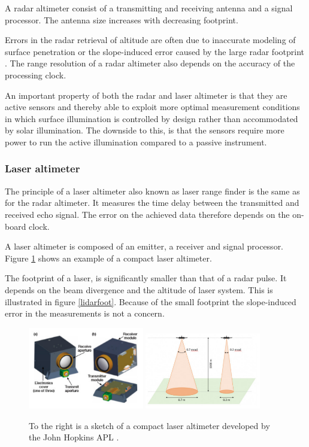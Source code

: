 A radar altimeter consist of a transmitting and receiving antenna and a signal processor. The antenna size increases with decreasing footprint.

Errors in the radar retrieval of altitude are often due to inaccurate modeling
of surface penetration or the slope-induced error caused by
the large radar footprint \cite{icealti}. The range resolution of a radar altimeter also depends on the accuracy of the processing clock.

An important property of both the radar and laser altimeter is that they are active sensors and thereby able to exploit more optimal measurement conditions in which surface illumination is controlled by design rather than accommodated by  solar illumination. The downside to this, is that the sensors require more power to run the active illumination compared to a passive instrument. 

\subsubsection{Laser altimeter}

The principle of a laser altimeter also known as laser range finder is the same as for the radar altimeter. It measures the time delay between the transmitted and received echo signal. The error on the achieved data therefore depends on the on-board clock.

A laser altimeter is composed of an emitter, a receiver and signal processor. Figure \ref{alti} shows an example of a compact laser altimeter. 

The footprint of a laser, is significantly smaller than that of a radar pulse. It depends on the beam divergence and the altitude of laser system. This is illustrated in figure \ref{lidarfoot}.  Because of the small footprint the slope-induced error in the measurements is not a concern.

\begin{figure}[H]
\begin{center}
\includegraphics[width=0.45\textwidth]{figures/navtheory/CLA}
\includegraphics[width=0.45\textwidth]{figures/navtheory/lidarfoot}
\caption{To the right is a sketch of a compact laser altimeter developed by the John Hopkins APL \cite{APLCLA}. \cite{footprint}}
\label{alti}
\end{center}
\end{figure}

